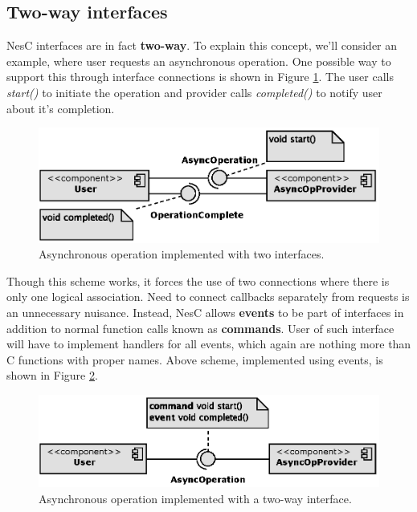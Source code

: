 \subsection{Two-way interfaces}

NesC interfaces are in fact {\bf two-way}. To explain this concept,
we'll consider an example, where user requests an asynchronous
operation. One possible way to support this through interface
connections is shown in Figure \ref{fig:two_way_interface1}. The user
calls \emph{start()} to initiate the operation and provider calls
\emph{completed()} to notify user about it's completion.

\begin{figure}[h]
  \centering
  \includegraphics{diagrams/two_way_interface1.eps}
  \caption{Asynchronous operation implemented with two interfaces.}
  \label{fig:two_way_interface1}
\end{figure}

Though this scheme works, it forces the use of two connections where
there is only one logical association. Need to connect callbacks
separately from requests is an unnecessary nuisance. Instead, NesC allows
{\bf events} to be part of interfaces in addition to normal function
calls known as {\bf commands}. User of such interface will have to
implement handlers for all events, which again are nothing more than C
functions with proper names. Above scheme, implemented using events,
is shown in Figure \ref{fig:two_way_interface2}.

\begin{figure}[h]
  \centering
  \includegraphics{diagrams/two_way_interface2.eps}
  \caption{Asynchronous operation implemented with a two-way interface.}
  \label{fig:two_way_interface2}
\end{figure}

